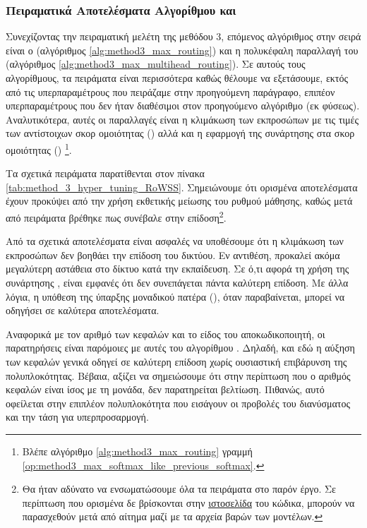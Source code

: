 \subsubsection{Πειραματικά Αποτελέσματα Αλγορίθμου  και }

Συνεχίζοντας την πειραματική μελέτη της μεθόδου 3, επόμενος αλγόριθμος στην σειρά είναι ο  (αλγόριθμος \ref{alg:method3_max_routing}) και η πολυκέφαλη παραλλαγή του (αλγόριθμος \ref{alg:method3_max_multihead_routing}). Σε αυτούς τους αλγορίθμους, τα πειράματα είναι περισσότερα καθώς θέλουμε να εξετάσουμε, εκτός από τις υπερπαραμέτρους που πειράζαμε στην προηγούμενη παράγραφο, επιπέον υπερπαραμέτρους που δεν ήταν διαθέσιμοι στον προηγούμενο αλγόριθμο (εκ φύσεως). Αναλυτικότερα, αυτές οι παραλλαγές είναι η κλιμάκωση των εκπροσώπων με τις τιμές των αντίστοιχων σκορ ομοιότητας () αλλά και η εφαρμογή της συνάρτησης  στα σκορ ομοιότητας () \footnote{Βλέπε αλγόριθμο \ref{alg:method3_max_routing} γραμμή \ref{op:method3_max_softmax_like_previous_softmax}.}.\par

Τα σχετικά πειράματα παρατίθενται στον πίνακα \ref{tab:method_3_hyper_tuning_RoWSS}. Σημειώνουμε ότι ορισμένα αποτελέσματα έχουν προκύψει από την χρήση εκθετικής μείωσης του ρυθμού μάθησης, καθώς μετά από πειράματα βρέθηκε πως συνέβαλε στην επίδοση\footnote{Θα ήταν αδύνατο να ενσωματώσουμε όλα τα πειράματα στο παρόν έργο. Σε περίπτωση που ορισμένα δε βρίσκονται στην \href{https://github.com/abarmper/Capsule_Nets_with_uncertainty}{ιστοσελίδα} του κώδικα, μπορούν να παρασχεθούν μετά από αίτημα μαζί με τα αρχεία βαρών των μοντέλων.}.\par

Από τα σχετικά αποτελέσματα είναι ασφαλές να υποθέσουμε ότι η κλιμάκωση των εκπροσώπων δεν βοηθάει την επίδοση του δικτύου. Εν αντιθέση, προκαλεί ακόμα μεγαλύτερη αστάθεια στο δίκτυο κατά την εκπαίδευση. Σε ό,τι αφορά τη χρήση της συνάρτησης , είναι εμφανές ότι δεν συνεπάγεται πάντα καλύτερη επίδοση. Με άλλα λόγια, η υπόθεση της ύπαρξης μοναδικού πατέρα (), όταν παραβαίνεται, μπορεί να οδηγήσει σε καλύτερα αποτελέσματα.\par

Αναφορικά με τον αριθμό των κεφαλών και το είδος του αποκωδικοποιητή, οι παρατηρήσεις είναι παρόμοιες με αυτές του αλγορίθμου . Δηλαδή, και εδώ η αύξηση των κεφαλών γενικά οδηγεί σε καλύτερη επίδοση χωρίς ουσιαστική επιβάρυνση της πολυπλοκότητας. Βέβαια, αξίζει να σημειώσουμε ότι στην περίπτωση που ο αριθμός κεφαλών είναι ίσος με τη μονάδα, δεν παρατηρείται βελτίωση. Πιθανώς, αυτό οφείλεται στην επιπλέον πολυπλοκότητα που εισάγουν οι προβολές του διανύσματος και την τάση για υπερπροσαρμογή.\par 


